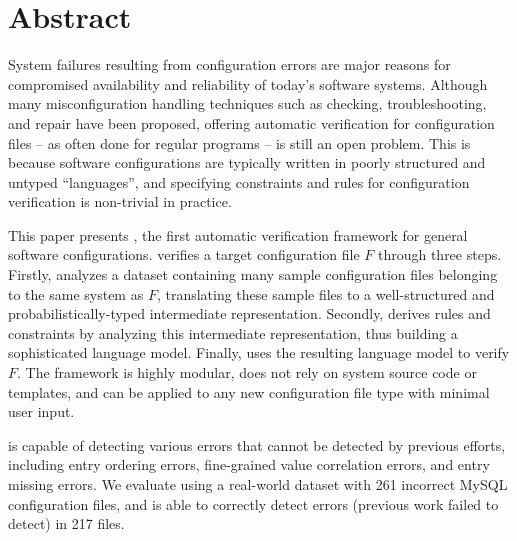 
\section*{Abstract}

System failures resulting from configuration errors 
are major reasons for compromised availability and
reliability of today's software systems.
Although many misconfiguration handling techniques
such as checking, troubleshooting, and repair
have been proposed, 
offering automatic verification for configuration files -- as often  
done for regular programs -- is still an open problem.
This is because software configurations are typically written in
poorly structured and untyped ``languages'', and 
specifying constraints and rules for configuration 
verification is non-trivial in practice.

This paper presents \app, the first automatic verification framework for
general software configurations.
\app verifies a target configuration file $F$ through three steps.
Firstly, \app analyzes a dataset containing many sample configuration 
files belonging to the same system as $F$,
translating these sample files to a
well-structured and probabilistically-typed 
intermediate representation.
Secondly, \app derives rules and constraints by analyzing
this intermediate representation, thus building a
sophisticated language model.
Finally, \app uses the resulting language model to verify $F$.
The \app framework is highly modular, 
does not rely on system source code or templates, and
can be applied to any new configuration file type with minimal user input. 

\app is capable of detecting various errors that cannot
be detected by previous efforts,
including entry ordering errors, fine-grained value correlation errors, 
and entry missing errors. 
We evaluate \app using a real-world dataset with 261 incorrect 
MySQL configuration files,
and \app is able to correctly 
detect errors (previous work failed to
detect) in 217 files.

